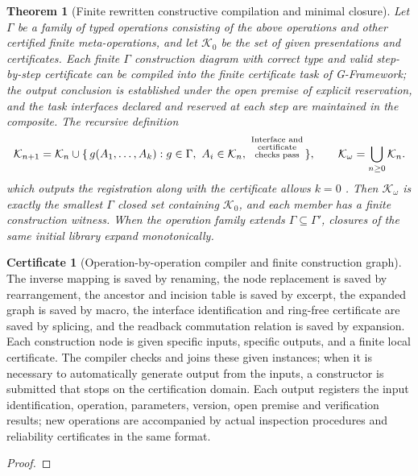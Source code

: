 \documentclass[11pt,a4paper]{article}
\theoremstyle{plain}
\newtheorem{theorem}{Theorem}[section]
\theoremstyle{definition}
\newtheorem*{certificate}{Certificate}
\theoremstyle{remark}
\begin{document}
\begin{CJK*}
\begin{theorem}
[Finite rewritten constructive compilation and minimal closure]\label{ar:finite-closure}
Let $\Gamma$ be a family of typed operations consisting of the above operations and other certified finite meta-operations, and let $\mathcal K_0$ be the set of given presentations and certificates. Each finite $\Gamma$ construction diagram with correct type and valid step-by-step certificate can be compiled into the finite certificate task of G-Framework; the output conclusion is established under the open premise of explicit reservation, and the task interfaces declared and reserved at each step are maintained in the composite. The recursive definition \[
 \mathcal K_{n+1}
 =\mathcal K_n\cup
 \{\,g(A_1,\ldots,A_k):
       g\in\Gamma,\ A_i\in\mathcal K_n,\
       \text{\shortstack[c]{\scriptsize Interface and\\[-1pt]\scriptsize certificate\\[-1pt]\scriptsize checks pass}}\,\},
 \qquad
 \mathcal K_\omega=\bigcup_{n\ge0}\mathcal K_n.
\] which outputs the registration along with the certificate allows $k=0$ . Then $\mathcal K_\omega$ is exactly the smallest $\Gamma$ closed set containing $\mathcal K_0$, and each member has a finite construction witness. When the operation family extends $\Gamma\subseteq\Gamma'$, closures of the same initial library expand monotonically.\end{theorem}
\begin{certificate}
[Operation-by-operation compiler and finite construction graph]The inverse mapping is saved by renaming, the node replacement is saved by rearrangement, the ancestor and incision table is saved by excerpt, the expanded graph is saved by macro, the interface identification and ring-free certificate are saved by splicing, and the readback commutation relation is saved by expansion. Each construction node is given specific inputs, specific outputs, and a finite local certificate. The compiler checks and joins these given instances; when it is necessary to automatically generate output from the inputs, a constructor is submitted that stops on the certification domain. Each output registers the input identification, operation, parameters, version, open premise and verification results; new operations are accompanied by actual inspection procedures and reliability certificates in the same format.\end{certificate}
\begin{proof}

\end{proof}
\end{CJK*}
\end{document}
